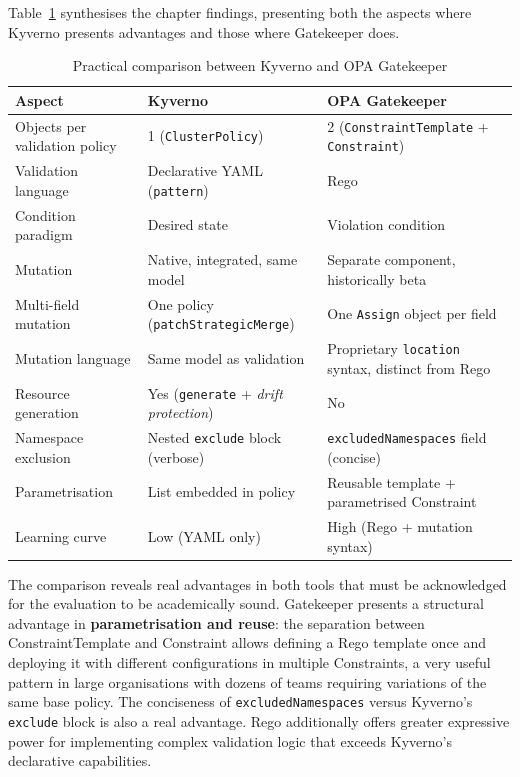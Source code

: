 Table~\ref{tab:kyverno-gatekeeper} synthesises the chapter findings, presenting both the aspects where Kyverno presents advantages and those where Gatekeeper does.

\begin{table}[H]
\centering
\caption{Practical comparison between Kyverno and OPA Gatekeeper}
\label{tab:kyverno-gatekeeper}
\small
\begin{tabular}{p{4.2cm} p{4.5cm} p{4.5cm}}
\toprule
\textbf{Aspect} & \textbf{Kyverno} & \textbf{OPA Gatekeeper} \\
\midrule
Objects per validation policy & 1 (\texttt{ClusterPolicy}) & 2 (\texttt{ConstraintTemplate} + \texttt{Constraint}) \\
\addlinespace
Validation language & Declarative YAML (\texttt{pattern}) & Rego \\
\addlinespace
Condition paradigm & Desired state & Violation condition \\
\addlinespace
Mutation & Native, integrated, same model & Separate component, historically beta \\
\addlinespace
Multi-field mutation & One policy (\texttt{patchStrategicMerge}) & One \texttt{Assign} object per field \\
\addlinespace
Mutation language & Same model as validation & Proprietary \texttt{location} syntax, distinct from Rego \\
\addlinespace
Resource generation & Yes (\texttt{generate} + \textit{drift protection}) & No \\
\addlinespace
Namespace exclusion & Nested \texttt{exclude} block (verbose) & \texttt{excludedNamespaces} field (concise) \\
\addlinespace
Parametrisation & List embedded in policy & Reusable template + parametrised Constraint \\
\addlinespace
Learning curve & Low (YAML only) & High (Rego + mutation syntax) \\
\bottomrule
\end{tabular}
\end{table}

The comparison reveals real advantages in both tools that must be acknowledged for the evaluation to be academically sound. Gatekeeper presents a structural advantage in \textbf{parametrisation and reuse}: the separation between ConstraintTemplate and Constraint allows defining a Rego template once and deploying it with different configurations in multiple Constraints, a very useful pattern in large organisations with dozens of teams requiring variations of the same base policy. The conciseness of \texttt{excludedNamespaces} versus Kyverno's \texttt{exclude} block is also a real advantage. Rego additionally offers greater expressive power for implementing complex validation logic that exceeds Kyverno's declarative capabilities.

